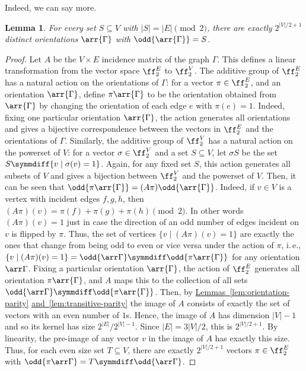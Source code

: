 \documentclass[11pt]{article}
\newcommand{\expref}[2]{\texorpdfstring{\hyperref[#2]{#1~\ref{#2}}}{#1~\ref{#2}}}
\newtheorem{lemma}[theorem]{Lemma}
\newcommand{\ie}{i.\,e.}
\begin{document}
Indeed, we can say more.
\begin{lemma}\label{lem:linear}
  For every set $S \subseteq V$ with $|S| = |E| \pmod 2$, there are exactly
  $2^{|V|/2 + 1}$ distinct orientations $\arr{\Gamma}$ with $\odd{\arr{\Gamma}} = S$.
\end{lemma}
\begin{proof}
  Let $A$ be the $V \times E$ incidence matrix of the graph $\Gamma$. This defines a
  linear transformation from the vector space $\ff_{2}^{E}$ to $\ff_{2}^{V}$.
  The additive group of $\ff_{2}^{E}$ has a natural action on the orientations
  of $\Gamma$: for a vector $\pi \in \ff_{2}^{E}$, and an orientation $\arr{\Gamma}$,
  define $\pi\arr{\Gamma}$ to be the orientation obtained from $\arr{\Gamma}$ by changing
  the orientation of each edge $e$ with $\pi(e) = 1$. Indeed, fixing one
  particular orientation $\arr{\Gamma}$, the action generates all orientations and
  gives a bijective correspondence between the vectors in $\ff_{2}^{E}$ and the
  orientations of $\Gamma$. Similarly, the additive group of $\ff_{2}^{V}$ has a
  natural action on the powerset of $V$: for a vector $\sigma \in \ff_{2}^{V}$
  and a set $S \subseteq V$, let $\sigma S$ be the set $S \symmdiff \{v \mid
  \sigma(v) = 1\}$. Again, for any fixed set $S$, this action generates all
  subsets of $V$ and gives a bijection between $\ff_{2}^{V}$ and the powerset
  of $V$.
  Then, it can be seen that $\odd{\pi \arr{\Gamma}} = (A \pi) \odd{\arr{\Gamma}}$. Indeed,
  if $v \in V$ is a vertex with incident edges $f,g,h$, then $(A\pi)(v) =
  \pi(f)+\pi(g)+\pi(h) \pmod 2$. In other words $(A\pi)(v) = 1$ just in case the
  direction of an odd number of edges incident on $v$ is flipped by $\pi$. Thus,
  the set of vertices $\{v \mid (A\pi)(v) = 1\}$ are exactly the ones that
  change from being odd to even or vice versa under the action of $\pi$, \ie,
  $\{v \mid (A\pi)(v) = 1\} = \odd{\arr \Gamma} \symmdiff \odd{\pi \arr{\Gamma}}$ for any
  orientation $\arr \Gamma$.
  Fixing a particular orientation $\arr{\Gamma}$, the action of $\ff_{2}^{E}$
  generates all orientation $\pi\arr{\Gamma}$, and $A$ maps this to the collection of
  all sets $\odd{\arr \Gamma} \symmdiff \odd{\pi \arr{\Gamma}}$. Then, by
  \expref{Lemmas}{lem:orientation-parity} \expref{and}{lem:transitive-parity} the image
  of $A$ consists of exactly the set of vectors with an even number of $1$s.
  Hence, the image of $A$ has dimension $|V|-1$ and so its kernel has size
  $2^{|E|}/2^{|V|-1}$. Since $|E| = 3|V|/2$, this is $2^{|V|/2+1}$. By
  linearity, the pre-image of any vector $v$ in the image of $A$ has exactly
  this size. Thus, for each even size set $T \subseteq V$, there are exactly
  $2^{|V|/2+1}$ vectors $\pi \in \ff_{2}^{E}$ with $\odd{\pi \arr \Gamma} = T
  \symmdiff \odd{\arr \Gamma}$.
\end{proof}
\end{document}
